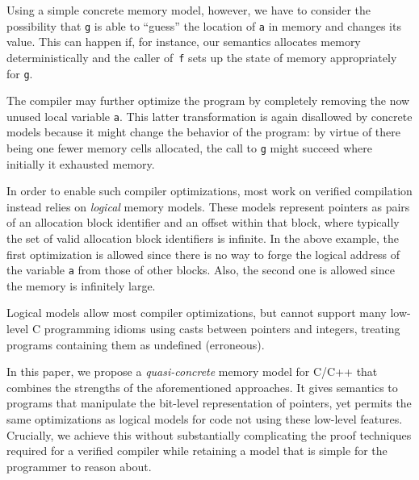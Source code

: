 \vskip 0.3cm Using a simple concrete memory model, however, we have to consider the possibility that
\texttt{g} is able to ``guess'' the location of \texttt{a} in memory and changes its value. This can
happen if, for instance, our semantics allocates memory deterministically and the caller
of~\texttt{f} sets up the state of memory appropriately for \texttt{g}.

%

The compiler may further optimize the program by completely removing
the now unused local variable \texttt{a}. This latter transformation is again
disallowed by concrete models because it might change the behavior of
the program:
by virtue of there being one fewer memory cells allocated, the call to \texttt{g}
might succeed where initially it exhausted memory.



In order to enable such compiler optimizations, most work on verified
compilation instead relies on \emph{logical} memory models.  These
models represent pointers as pairs of an allocation block identifier
and an offset within that block, where typically the set of valid
allocation block identifiers is infinite.  In the above
example, the first optimization is allowed since there is no way to
forge the logical address of the variable \texttt{a} from those of
other blocks. Also, the second one is allowed since the
memory is infinitely large.

Logical models allow most compiler optimizations, but cannot
support many low-level C programming idioms using casts
between pointers and integers, treating programs containing them
as undefined (\ie erroneous).


In this paper, we propose a \emph{quasi-concrete} memory model for C/C++ that
combines the strengths of the aforementioned approaches. It gives semantics to
programs that manipulate the bit-level representation of pointers, yet permits
the same optimizations as logical models for code not using these low-level
features. Crucially, we achieve this without substantially complicating the
proof techniques required for a verified compiler while retaining a model that is
simple for the programmer to reason about.

